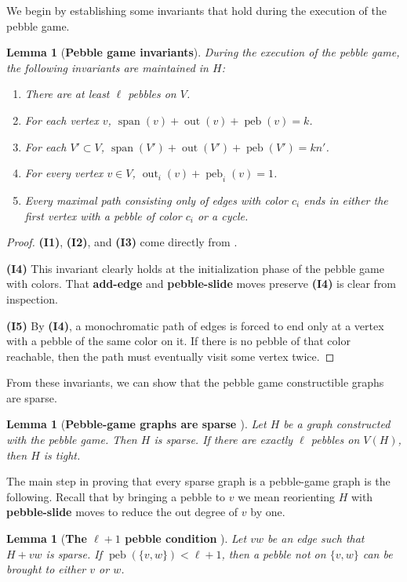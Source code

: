 \documentclass[Svgc,nospthms]{Svgc}
\newtheorem{lemma}[theorem]{Lemma}
\newcommand{\labellem}[1]{\label{lem.#1}}
\newcommand{\peb}{\ensuremath{\operatorname{peb}}}
\newcommand{\grsp}{\ensuremath{\operatorname{span}}}
\newcommand{\out}{\ensuremath{\operatorname{out}}}
\begin{document}
	
We begin by establishing some invariants that hold during the execution of the pebble game.
	\begin{lemma}[{\bf Pebble game invariants}]
		During the execution of the pebble game, the following invariants are maintained in $H$: 
		\begin{enumerate}
			\item[{\bf (I1)}] There are at least $\ell$ pebbles on $V$.  \cite{pebblegame}
			\item[{\bf (I2)}] For each vertex $v$, $\grsp (v) + \out (v) + \peb (v)=k$.  \cite{pebblegame}
			\item[{\bf (I3)}] For each $V'\subset V$, $\grsp (V')+\out (V')+\peb (V')=kn'$. \cite{pebblegame}
			\item[{\bf (I4)}] For every vertex $v\in V$, $\out_i (v)+\peb_i (v)=1$. 
			\item[{\bf (I5)}] Every maximal path consisting only of edges with color $c_i$ ends in either the first vertex with a pebble of color $c_i$ or a cycle. 
		\end{enumerate}
		\labellem{pebble-game-invariants} 
\end{lemma}

	\begin{proof}
		{\bf (I1)}, 
		{\bf (I2)}, 
		and {\bf (I3)} come directly from \cite{pebblegame}.
		
		{\bf (I4)} This invariant clearly holds at the initialization phase of the pebble game with colors. That {\bf add-edge} and {\bf pebble-slide} moves preserve {\bf (I4)} is clear from inspection. 
		
		{\bf (I5)} By {\bf (I4)}, a monochromatic path of edges is forced to end only at a vertex with a pebble of the same color on it. If there is no pebble of that color reachable, then the path must eventually visit some vertex twice. 
	 \end{proof}
	
	From these invariants, we can show that the pebble game constructible graphs are sparse.
\begin{lemma}[{\bf Pebble-game graphs are sparse \cite{pebblegame}}]\labellem{pebble-graphs-are-sparse}
		Let $H$ be a graph constructed with the pebble game. Then $H$ is sparse. 
		If there are exactly $\ell$ pebbles on $V(H)$, then $H$ is tight.  
\end{lemma}
	
The main step in proving that every sparse graph is a pebble-game graph is the following.  Recall
that by bringing a pebble to $v$ we mean reorienting $H$ with {\bf pebble-slide} moves to reduce the 
out degree of $v$ by one.
\begin{lemma}[{\bf The $\ell+1$ pebble condition} \cite{pebblegame}]\labellem{can-bring-another-pebble}
Let $vw$ be an edge such that $H+vw$ is sparse. If $\peb (\{v,w\})<\ell+1$, 
then a pebble not on $\{v,w\}$ can be brought to either $v$ or $w$.  
\end{lemma}
\end{document}
